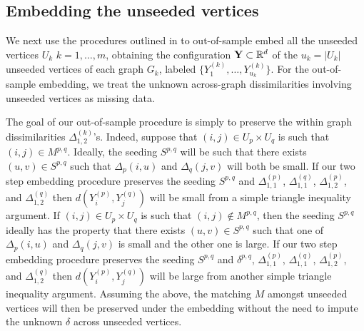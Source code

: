 \documentclass[12pt]{article}
\numberwithin{equation}{section}
\theoremstyle{definition}
\newcommand{\gD}{{\Delta}}
\begin{document}
\subsection{Embedding the unseeded vertices}
\label{S:ns}


We next use the procedures outlined in \cite{oos} to out-of-sample embed all the unseeded vertices $U_k$ $k=1, \ldots, m$, obtaining the configuration ${\bf Y}\subset\mathbb{R}^d$ of the $u_k= |U_k|$ unseeded vertices of each graph $G_k$, labeled $\{Y^{(k)}_1,\ldots,Y^{(k)}_{u_k}\}$.
For the out-of-sample embedding, we treat the unknown across-graph dissimilarities involving unseeded vertices as missing data.


The goal of our out-of-sample procedure is simply to preserve the within graph dissimilarities $\Delta^{(k)}_{1,2}$'s.
Indeed, suppose that $(i,j)\in U_p\times U_q$ is such that $(i,j)\in M^{p,q}$.  Ideally, the seeding $S^{p,q}$ will be such that there exists $(u,v)\in S^{p,q}$ such that $\Delta_p(i,u)$ and $\Delta_q(j,v)$ will both be small.
If our two step embedding procedure preserves the seeding $S^{p,q}$ and $\Delta^{(p)}_{1,1}$, $\Delta^{(q)}_{1,1}$, $\Delta^{(p)}_{1,2}$, and $\Delta^{(q)}_{1,2}$ then $d(Y^{(p)}_i, Y^{(q)}_j)$ will be small from a simple triangle inequality argument.
If $(i,j)\in U_p\times U_q$ is such that $(i,j)\notin M^{p,q}$, then the seeding $S^{p,q}$ ideally has the property that there exists $(u,v)\in S^{p,q}$ such that one of $\Delta_p(i,u)$ and $\Delta_q(j,v)$ is small and the other one is large.
If our two step embedding procedure preserves the seeding $S^{p,q}$ and $\delta^{p,q}$, $\Delta^{(p)}_{1,1}$, $\Delta^{(q)}_{1,1}$, $\Delta^{(p)}_{1,2}$, and $\Delta^{(q)}_{1,2}$ then $d(Y^{(p)}_i, Y^{(q)}_j)$ will be large from another simple triangle inequality argument.
Assuming the above, the matching $M$ amongst unseeded vertices will then be preserved under the embedding without the need to impute the unknown $\delta$ across unseeded vertices.


\end{document}
